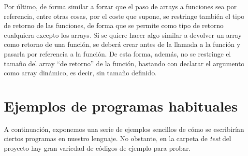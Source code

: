 \documentclass[10pt,a4paper]{article}
\begin{document}
Por último, de forma similar a forzar que el paso de arrays a funciones sea por referencia, entre otras cosas, por el coste que supone, se restringe también el tipo de retorno de las funciones, de forma que se permite como tipo de retorno cualquiera excepto los arrays. Si se quiere hacer algo similar a devolver un array como retorno de una función, se deberá crear antes de la llamada a la función y pasarla por referencia a la función. De esta forma, además, no se restringe el tamaño del array ``de retorno'' de la función, bastando con declarar el argumento como array dinámico, es decir, sin tamaño definido.

\newpage
\appendix

\section{Ejemplos de programas habituales}\label{sec:Ejemplos de programas habituales}
A continuación, exponemos una serie de ejemplos sencillos de cómo se escribirían ciertos programas en nuestro lenguaje. No obstante, en la carpeta de \textit{test} del proyecto hay gran variedad de códigos de ejemplo para probar.






\end{document}
